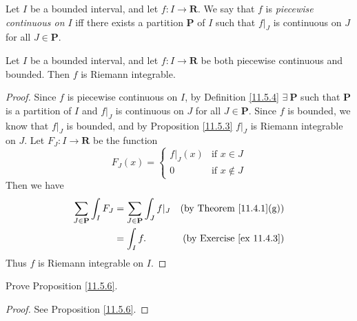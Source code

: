 \begin{definition}\label{11.5.4}
    Let \(I\) be a bounded interval, and let \(f : I \to \mathbf{R}\).
    We say that \(f\) is \emph{piecewise continuous on \(I\)} iff there exists a partition \(\mathbf{P}\) of \(I\) such that \(f|_J\) is continuous on \(J\) for all \(J \in \mathbf{P}\).
\end{definition}

\setcounter{theorem}{5}
\begin{proposition}\label{11.5.6}
    Let \(I\) be a bounded interval, and let \(f : I \to \mathbf{R}\) be both piecewise continuous and bounded.
    Then \(f\) is Riemann integrable.
\end{proposition}

\begin{proof}
    Since \(f\) is piecewise continuous on \(I\), by Definition \ref{11.5.4} \(\exists\ \mathbf{P}\) such that \(\mathbf{P}\) is a partition of \(I\) and \(f|_J\) is continuous on \(J\) for all \(J \in \mathbf{P}\).
    Since \(f\) is bounded, we know that \(f|_J\) is bounded, and by Proposition \ref{11.5.3} \(f|_J\) is Riemann integrable on \(J\).
    Let \(F_J : I \to \mathbf{R}\) be the function
    \[
        F_J(x) = \begin{cases}
            f|_J(x) & \text{if } x \in J    \\
            0       & \text{if } x \notin J
        \end{cases}
    \]
    Then we have
    \begin{align*}
        \sum_{J \in \mathbf{P}} \int_I F_J & = \sum_{J \in \mathbf{P}} \int_J f|_J & \text{(by Theorem \ref{11.4.1}(g))}  \\
                                           & = \int_I f.                           & \text{(by Exercise \ref{ex 11.4.3})}
    \end{align*}
    Thus \(f\) is Riemann integrable on \(I\).
\end{proof}

\exercisesection

\begin{exercise}\label{ex 11.5.1}
    Prove Proposition \ref{11.5.6}.
\end{exercise}

\begin{proof}
    See Proposition \ref{11.5.6}.
\end{proof}